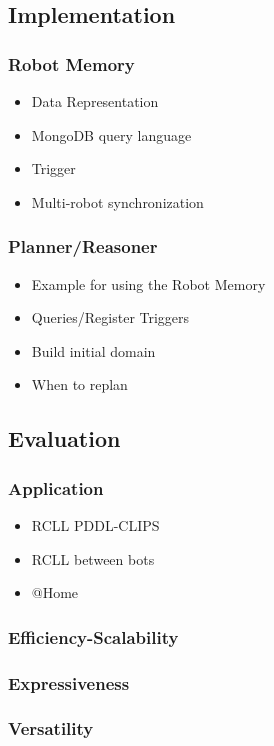 \documentclass[a4paper,11pt]{article}
\begin{document}
\subsection{Implementation}
\label{sec:impl}
\subsubsection{Robot Memory}
\label{sec:impl-memory}
\begin{itemize}
\item Data Representation
\item MongoDB query language
\item Trigger
\item Multi-robot synchronization
\end{itemize}
\subsubsection{Planner/Reasoner}
\label{sec:impl-planner}
\begin{itemize}
\item Example for using the Robot Memory
\item Queries/Register Triggers
\item Build initial domain
\item When to replan
\end{itemize}

\subsection{Evaluation}
\label{sec:eval}
\subsubsection{Application}
\label{sec:eval-apl}
\begin{itemize}
\item RCLL PDDL-CLIPS
\item RCLL between bots
\item @Home
\end{itemize}
\subsubsection{Efficiency-Scalability}
\subsubsection{Expressiveness}
\subsubsection{Versatility}
\end{document}
